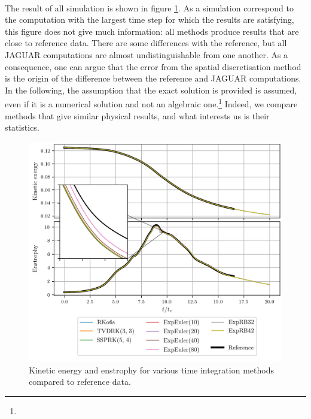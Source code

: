       \paragraph{}
      The result of all simulation is shown in figure \ref{fig:tgv_curves}.
      As a simulation correspond to the computation with the largest time step for which the results are satisfying, this figure does not give much information: all methods produce results that are close to reference data.
      There are some differences with the reference, but all JAGUAR computations are almost undistinguishable from one another.
      As a consequence, one can argue that the error from the spatial discretisation method is the origin of the difference between
      the reference and JAGUAR computations.
      In the following, the assumption that the exact solution is provided is assumed, even if it is a numerical solution and not an algebraic one.\footnote{}
      Indeed, we compare methods that give similar physical results, and what interests us is their statistics.

      \begin{figure}
        \centering
        \includegraphics{figures/tgv_curves.png}
        \caption{Kinetic energy and enstrophy for various time integration methods compared to reference data.}
        \label{fig:tgv_curves}
      \end{figure}

